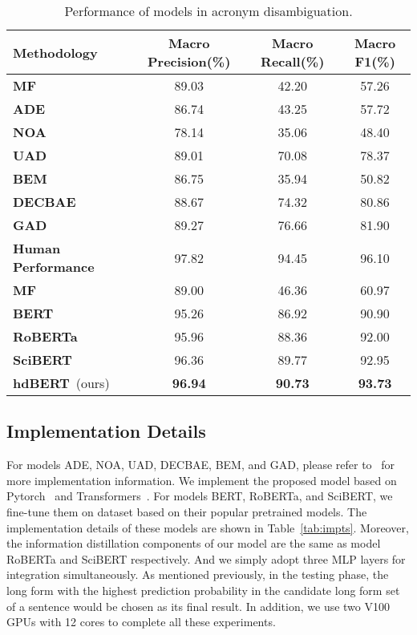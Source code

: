 \begin{table*}%
    \centering
    \begin{tabular}{l|ccc}
    \hline
         \textbf{Methodology} & \textbf{Macro Precision}(\%) & \textbf{Macro Recall}(\%) & \textbf{Macro F1}(\%) \\
         \hline
         \textbf{MF} & 89.03 & 42.20 & 57.26 \\
         \textbf{ADE}~\cite{li2018guess} & 86.74  & 43.25  & 57.72 \\
         \textbf{NOA}~\cite{charbonnier2018using} & 78.14  & 35.06  & 48.40 \\
         \textbf{UAD}~\cite{ciosici2019unsupervised} & 89.01  & 70.08  & 78.37 \\
         \textbf{BEM}~\cite{blevins2020moving} & 86.75  & 35.94  & 50.82 \\
         \textbf{DECBAE}~\cite{jin2019deep} & 88.67  & 74.32  & 80.86 \\
         \textbf{GAD}~\cite{veyseh-et-al-2020-what} & 89.27  & 76.66  & 81.90 \\
         \textbf{Human Performance}~\cite{veyseh-et-al-2020-what} & 97.82  & 94.45  & 96.10 \\
         \hline
         \textbf{MF} & 89.00 & 46.36 & 60.97 \\
         \textbf{BERT}~\cite{devlin2018bert} & 95.26& 86.92& 90.90\\
         \textbf{RoBERTa}~\cite{liu2019roberta} & 95.96 & 88.36 & 92.00\\
         \textbf{SciBERT}~\cite{Beltagy2019SciBERT} & 96.36 & 89.77 & 92.95\\
         \textbf{hdBERT}~(ours) & \textbf{96.94} & \textbf{90.73} & \textbf{93.73}\\
         \hline
    \end{tabular}
    \caption{Performance of models in acronym disambiguation.}
    \label{tab:results}
\end{table*}

\subsection{Implementation Details}
For models ADE, NOA, UAD, DECBAE, BEM, and GAD, please refer to~\citeauthor{veyseh-et-al-2020-what} for more implementation information.
We implement the proposed model based on Pytorch~\cite{paszke2019pytorch} and Transformers~\cite{wolf-etal-2020-transformers}.
For models BERT, RoBERTa, and SciBERT, we fine-tune them on dataset based on their popular pretrained models. The implementation details of these models are shown in Table~\ref{tab:impts}. Moreover, the information distillation components of our model are the same as model RoBERTa and SciBERT respectively. And we simply adopt three MLP layers for integration simultaneously. As mentioned previously, in the testing phase, the long form with the highest prediction probability in the candidate long form set of a sentence would be chosen as its final result. In addition, we use two V100 GPUs with 12 cores to complete all these experiments.



